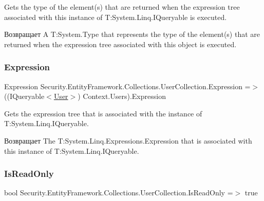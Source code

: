 Gets the type of the element(s) that are returned when the expression tree associated with this instance of T\+:\+System.\+Linq.\+I\+Queryable is executed. 

\begin{DoxyReturn}{Возвращает}
A T\+:\+System.\+Type that represents the type of the element(s) that are returned when the expression tree associated with this object is executed. 
\end{DoxyReturn}
\mbox{\label{class_security_1_1_entity_framework_1_1_collections_1_1_user_collection_a25f0966d52ce11f4c9f6edfbf244d32d}} 
\subsubsection{\texorpdfstring{Expression}{Expression}}
{\footnotesize\ttfamily Expression Security.\+Entity\+Framework.\+Collections.\+User\+Collection.\+Expression =$>$ ((I\+Queryable$<$\hyperlink{class_security_1_1_model_1_1_user}{User}$>$) Context.\+Users).Expression}



Gets the expression tree that is associated with the instance of T\+:\+System.\+Linq.\+I\+Queryable. 

\begin{DoxyReturn}{Возвращает}
The T\+:\+System.\+Linq.\+Expressions.\+Expression that is associated with this instance of T\+:\+System.\+Linq.\+I\+Queryable. 
\end{DoxyReturn}
\mbox{\label{class_security_1_1_entity_framework_1_1_collections_1_1_user_collection_a4c19bdcbdfbf3b3dbeb392c57d9657a7}} 
\subsubsection{\texorpdfstring{Is\+Read\+Only}{IsReadOnly}}
{\footnotesize\ttfamily bool Security.\+Entity\+Framework.\+Collections.\+User\+Collection.\+Is\+Read\+Only =$>$ true}



